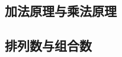 \subsection{加法原理与乘法原理}
\label{cbasic:ssec:amp}

\questions


\subsection{排列数与组合数}
\label{cbasic:ssec:pcn}

\questions


